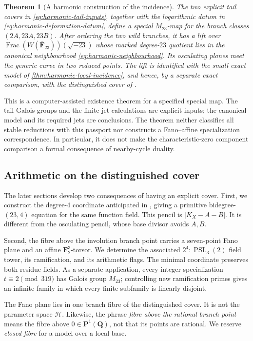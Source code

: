 \documentclass[11pt]{amsart}
\newtheorem{theorem}{Theorem}[section]
\theoremstyle{definition}
\theoremstyle{remark}
\newcommand{\QQ}{\mathbf Q}
\newcommand{\FF}{\mathbf F}
\newcommand{\PP}{\mathbf P}
\newcommand{\PSL}{\operatorname{PSL}}
\begin{document}
\begin{theorem}[A harmonic construction of the incidence]
\label{thm:harmonic-construction-summary}
The two explicit tail covers in \cref{eq:harmonic-tail-inputs}, together
with the logarithmic datum in \cref{eq:harmonic-deformation-datum},
define a special $M_{23}$-map for the branch classes $(2A,23A,23B)$.
After ordering the two wild branches, it has a lift over
$\operatorname{Frac}(W(\overline{\FF}_{23}))(\sqrt{-23})$ whose marked
degree-$23$ quotient lies in the canonical neighbourhood
\cref{eq:harmonic-neighbourhood}.
Its osculating planes meet the generic curve in two reduced points.
The lift is identified with the small exact model of
\cref{thm:harmonic-local-incidence}, and hence, by a separate exact
comparison, with the distinguished cover of \cite{HJLPPZ}.
\end{theorem}

This is a computer-assisted existence theorem for a specified special
map.  The tail Galois groups and the finite jet calculations are
explicit inputs; the canonical model and its required jets are
conclusions.  The theorem neither classifies all stable reductions
with this passport nor constructs a Fano--affine specialization
correspondence.  In particular, it does not make the characteristic-zero
component comparison a formal consequence of nearby-cycle duality.

\subsection{Arithmetic on the distinguished cover}

The later sections develop two consequences of having an explicit cover.
First, we construct the degree-$4$ coordinate anticipated in
\cite[Remark~3.4]{HJLPPZ}, giving a primitive bidegree-$(23,4)$ equation
for the same function field.  This pencil is $|K_X-A-B|$.
It is different from the osculating pencil, whose base divisor avoids
$A,B$.

Second, the fibre above the involution branch point carries a seven-point
Fano plane and an affine $\FF_2^3$-torsor.  We determine the associated
$2^4{:}\PSL_3(2)$ field tower, its ramification, and its arithmetic flags.
The minimal coordinate preserves both residue fields.
As a separate application, every integer specialization
$t\equiv2\pmod{319}$ has Galois group $M_{23}$; controlling new
ramification primes gives an infinite family in which every finite
subfamily is linearly disjoint.

The Fano plane lies in one branch fibre of the distinguished cover.
It is not the parameter space $\mathcal H$.
Likewise, the phrase \emph{fibre above the rational branch point} means
the fibre above $0\in\PP^1(\QQ)$, not that its points are rational.
We reserve \emph{closed fibre} for a model over a local base.
\end{document}
